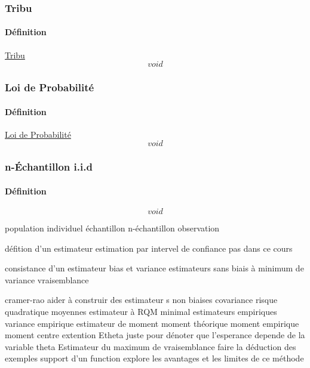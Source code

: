 \documentclass{article}
\begin{document}
\subsubsection{Tribu}
\paragraph{Définition} \href{https://fr.wikipedia.org/wiki/Tribu_(math%C3%A9matiques)}{Tribu}
\begin{equation}
    \boxed{
        void
    }
\end{equation}

\subsubsection{Loi de Probabilité}
\paragraph{Définition} \href{https://fr.wikipedia.org/wiki/Loi_de_probabilit%C3%A9}{Loi de Probabilité}
\begin{equation}
    \boxed{
        void
    }
\end{equation}

\subsubsection{n-Échantillon i.i.d}
\paragraph{Définition}
\begin{equation}
    \boxed{
        void
    }
\end{equation}

population
individuel
échantillon
n-échantillon
observation

défition d'un estimateur
estimation par intervel de confiance pas dans ce cours

consistance d'un estimateur
bias et variance
estimateurs sans biais à minimum de variance
vraisemblance

cramer-rao
aider à construir des estimateur s non biaises
covariance
risque quadratique moyennes
estimateur à RQM minimal
estimateurs empiriques
variance empirique
estimateur de moment
moment théorique
moment empirique
moment centre
extention
Etheta juste pour dénoter que l'esperance depende de la variable theta
Estimateur du maximum de vraisemblance
faire la déduction des exemples
support d'un function
explore les avantages et les limites de ce méthode

\end{document}
